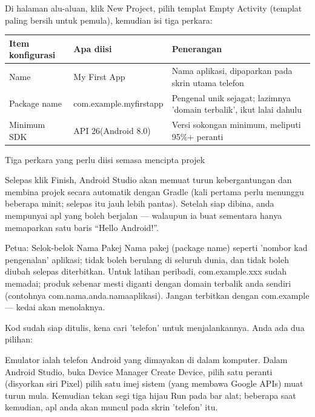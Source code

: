 Di halaman alu-aluan, klik New Project, pilih templat Empty Activity (templat paling bersih untuk pemula), kemudian isi tiga perkara:

\begin{center}
\begin{tabularx}{\linewidth}{|X|X|X|}
\hline
\textbf{Item konfigurasi} & \textbf{Apa diisi} & \textbf{Penerangan} \tabularnewline
\hline
Name & My First App & Nama aplikasi, dipaparkan pada skrin utama telefon \tabularnewline
Package name & com.example.myfirstapp & Pengenal unik sejagat; lazimnya 'domain terbalik', ikut lalai dahulu \tabularnewline
Minimum SDK & API 26(Android 8.0) & Versi sokongan minimum, meliputi 95\%+ peranti \tabularnewline
\hline
\end{tabularx}
\end{center}

\begin{center}\small\color{gray}Tiga perkara yang perlu diisi semasa mencipta projek\end{center}

Selepas klik Finish, Android Studio akan memuat turun kebergantungan dan membina projek secara automatik dengan Gradle (kali pertama perlu menunggu beberapa minit; selepas itu jauh lebih pantas). Setelah siap dibina, anda mempunyai apl yang boleh berjalan — walaupun ia buat sementara hanya memaparkan satu baris “Hello Android!”.

\begin{tcbinfo}{Petua: Selok-belok Nama Pakej}
Nama pakej (package name) seperti 'nombor kad pengenalan' aplikasi; tidak boleh berulang di seluruh dunia, dan tidak boleh diubah selepas diterbitkan. Untuk latihan peribadi, com.example.xxx sudah memadai; produk sebenar mesti diganti dengan domain terbalik anda sendiri (contohnya com.nama.anda.namaaplikasi). Jangan terbitkan dengan com.example — kedai akan menolaknya.

\end{tcbinfo}


Kod sudah siap ditulis, kena cari 'telefon' untuk menjalankannya. Anda ada dua pilihan:


Emulator ialah telefon Android yang dimayakan di dalam komputer. Dalam Android Studio, buka Device Manager Create Device, pilih satu peranti (disyorkan siri Pixel) pilih satu imej sistem (yang membawa Google APIs) muat turun mula. Kemudian tekan segi tiga hijau Run pada bar alat; beberapa saat kemudian, apl anda akan muncul pada skrin 'telefon' itu.

